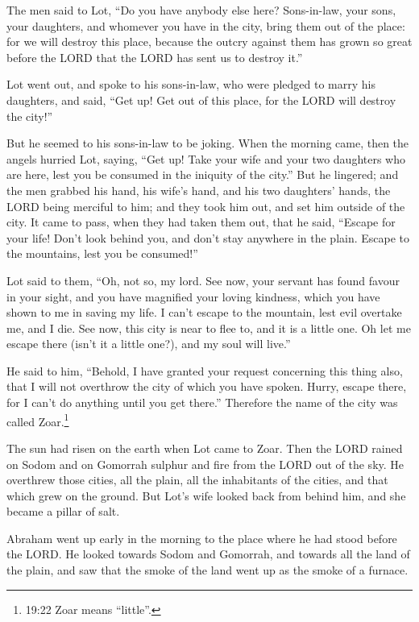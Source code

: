  The men said to Lot, ``Do you have anybody else here?
Sons-in-law, your sons, your daughters, and whomever you have in the
city, bring them out of the place:  for we will destroy
this place, because the outcry against them has grown so great before
the LORD that the LORD has sent us to destroy it.''

 Lot went out, and spoke to his sons-in-law, who were
pledged to marry his daughters, and said, ``Get up! Get out of this
place, for the LORD will destroy the city!''

But he seemed to his sons-in-law to be joking.  When the
morning came, then the angels hurried Lot, saying, ``Get up! Take your
wife and your two daughters who are here, lest you be consumed in the
iniquity of the city.''  But he lingered; and the men
grabbed his hand, his wife's hand, and his two daughters' hands, the
LORD being merciful to him; and they took him out, and set him outside
of the city.  It came to pass, when they had taken them
out, that he said, ``Escape for your life! Don't look behind you, and
don't stay anywhere in the plain. Escape to the mountains, lest you be
consumed!''

 Lot said to them, ``Oh, not so, my lord.  See
now, your servant has found favour in your sight, and you have magnified
your loving kindness, which you have shown to me in saving my life. I
can't escape to the mountain, lest evil overtake me, and I die.
 See now, this city is near to flee to, and it is a little
one. Oh let me escape there (isn't it a little one?), and my soul will
live.''

 He said to him, ``Behold, I have granted your request
concerning this thing also, that I will not overthrow the city of which
you have spoken.  Hurry, escape there, for I can't do
anything until you get there.'' Therefore the name of the city was
called Zoar.\footnote{19:22 Zoar means ``little''.}

 The sun had risen on the earth when Lot came to Zoar.
 Then the LORD rained on Sodom and on Gomorrah sulphur and
fire from the LORD out of the sky.  He overthrew those
cities, all the plain, all the inhabitants of the cities, and that which
grew on the ground.  But Lot's wife looked back from behind
him, and she became a pillar of salt.

 Abraham went up early in the morning to the place where he
had stood before the LORD.  He looked towards Sodom and
Gomorrah, and towards all the land of the plain, and saw that the smoke
of the land went up as the smoke of a furnace.

